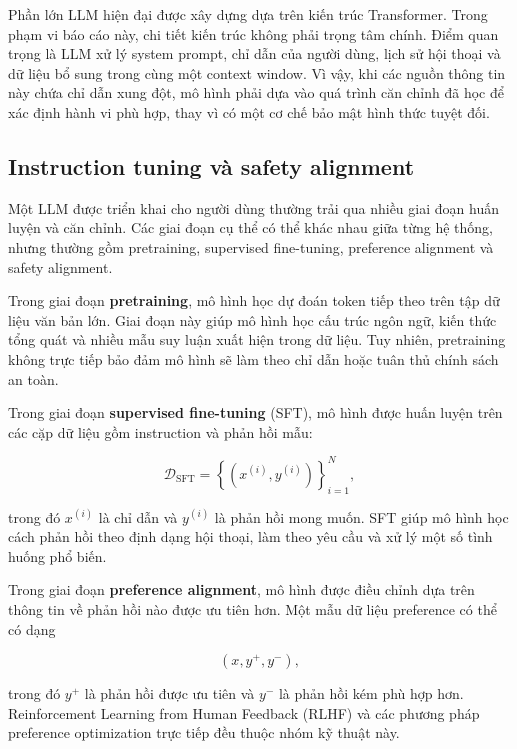Phần lớn LLM hiện đại được xây dựng dựa trên kiến trúc Transformer. Trong
phạm vi báo cáo này, chi tiết kiến trúc không phải trọng tâm chính. Điểm
quan trọng là LLM xử lý system prompt, chỉ dẫn của người dùng, lịch sử hội
thoại và dữ liệu bổ sung trong cùng một context window. Vì vậy, khi các
nguồn thông tin này chứa chỉ dẫn xung đột, mô hình phải dựa vào quá trình
căn chỉnh đã học để xác định hành vi phù hợp, thay vì có một cơ chế bảo
mật hình thức tuyệt đối.

\subsection{Instruction tuning và safety alignment}
\label{subsec:model-training-alignment}

Một LLM được triển khai cho người dùng thường trải qua nhiều giai đoạn
huấn luyện và căn chỉnh. Các giai đoạn cụ thể có thể khác nhau giữa từng
hệ thống, nhưng thường gồm pretraining, supervised fine-tuning,
preference alignment và safety alignment.

Trong giai đoạn \textbf{pretraining}, mô hình học dự đoán token tiếp theo
trên tập dữ liệu văn bản lớn. Giai đoạn này giúp mô hình học cấu trúc ngôn
ngữ, kiến thức tổng quát và nhiều mẫu suy luận xuất hiện trong dữ liệu.
Tuy nhiên, pretraining không trực tiếp bảo đảm mô hình sẽ làm theo chỉ dẫn
hoặc tuân thủ chính sách an toàn.

Trong giai đoạn \textbf{supervised fine-tuning} (SFT), mô hình được huấn
luyện trên các cặp dữ liệu gồm instruction và phản hồi mẫu:

\begin{equation}
    \mathcal{D}_{\mathrm{SFT}}
    =
    \left\{
        (x^{(i)}, y^{(i)})
    \right\}_{i=1}^{N},
\end{equation}

trong đó $x^{(i)}$ là chỉ dẫn và $y^{(i)}$ là phản hồi mong muốn. SFT giúp
mô hình học cách phản hồi theo định dạng hội thoại, làm theo yêu cầu và
xử lý một số tình huống phổ biến.

Trong giai đoạn \textbf{preference alignment}, mô hình được điều chỉnh dựa
trên thông tin về phản hồi nào được ưu tiên hơn. Một mẫu dữ liệu preference
có thể có dạng

\begin{equation}
    (x, y^{+}, y^{-}),
\end{equation}

trong đó $y^{+}$ là phản hồi được ưu tiên và $y^{-}$ là phản hồi kém phù
hợp hơn. Reinforcement Learning from Human Feedback (RLHF) và các phương
pháp preference optimization trực tiếp đều thuộc nhóm kỹ thuật này.

